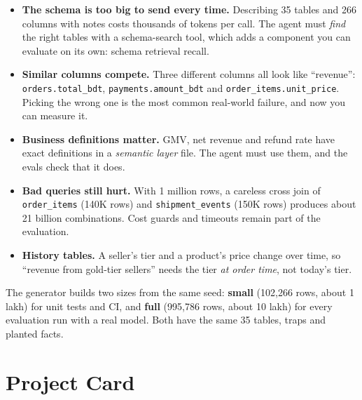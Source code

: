 \documentclass[11pt,a4paper]{article}
\newcommand{\code}[1]{\texttt{\small #1}}
\begin{document}
\begin{itemize}
\item \textbf{The schema is too big to send every time.} Describing 35 tables and 266 columns with
notes costs thousands of tokens per call. The agent must \emph{find} the right tables with a
schema-search tool, which adds a component you can evaluate on its own: schema retrieval recall.
\item \textbf{Similar columns compete.} Three different columns all look like ``revenue'':
\code{orders.total\_bdt}, \code{payments.amount\_bdt} and \code{order\_items.unit\_price}. Picking the
wrong one is the most common real-world failure, and now you can measure it.
\item \textbf{Business definitions matter.} GMV, net revenue and refund rate have exact
definitions in a \emph{semantic layer} file. The agent must use them, and the evals check that it does.
\item \textbf{Bad queries still hurt.} With 1 million rows, a careless cross join of
\code{order\_items} (140K rows) and \code{shipment\_events} (150K rows) produces about 21 billion
combinations. Cost guards and timeouts remain part of the evaluation.
\item \textbf{History tables.} A seller's tier and a product's price change over time, so ``revenue
from gold-tier sellers'' needs the tier \emph{at order time}, not today's tier.
\end{itemize}

The generator builds two sizes from the same seed: \textbf{small} (102{,}266 rows, about 1 lakh) for
unit tests and CI, and \textbf{full} (995{,}786 rows, about 10 lakh) for every evaluation run with a
real model. Both have the same 35 tables, traps and planted facts.

\section{Project Card}
\end{document}
